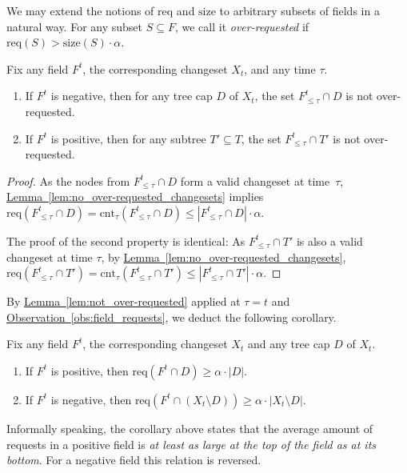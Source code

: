 \documentclass[sigconf,screen=true]{acmart}
\newcommand{\lref}[2][]{\hyperref[#2]{#1~\ref*{#2}}}
\newcommand{\size}{\textrm{size}}
\newcommand{\req}{\textrm{req}}
\newcommand{\cnt}{\textrm{cnt}}
\begin{document}
We may extend the notions of $\req$ and $\size$ to arbitrary subsets of fields
in a natural way.
For any subset $S \subseteq F$, we call it \emph{over-requested} if
$\req(S) > \size(S) \cdot \alpha$. 

\begin{lemma}
\label{lem:not_over-requested}
Fix any field $F^t$, the corresponding changeset $X_t$, and any time $\tau$.
\begin{enumerate}
\item If $F^t$ is negative, then for any tree cap $D$ of $X_t$, the set
    $F^t_{\leq \tau} \cap D$ is not over-requested.
\item If $F^t$ is positive, then for any subtree $T' \subseteq T$, the set
    $F^t_{\leq \tau} \cap T'$ is not over-requested.
\end{enumerate}
\end{lemma}

\begin{proof} 
As the nodes from $F^t_{\leq \tau} \cap D$ form a valid changeset at time~$\tau$, 
\lref[Lemma]{lem:no_over-requested_changesets} implies $\req(F^t_{\leq
\tau} \cap D) = \cnt_\tau(F^t_{\leq \tau} \cap D) \leq |F^t_{\leq \tau} \cap
D| \cdot \alpha$.

The proof of the second property is identical: As $F^t_{\leq \tau} \cap T'$ is
also a valid changeset at time $\tau$, by
\lref[Lemma]{lem:no_over-requested_changesets}, $\req(F^t_{\leq \tau}
\cap T') = \cnt_\tau(F^t_{\leq \tau} \cap T')
\leq |F^t_{\leq \tau} \cap T'| \cdot \alpha$. 
\end{proof}

By \lref[Lemma]{lem:not_over-requested} applied at $\tau = t$ and
\lref[Observation]{obs:field_requests}, we deduct the following corollary.

\begin{corollary}
\label{cor:density}
Fix any field $F^t$, the corresponding changeset $X_t$ and any tree
cap $D$ of $X_t$. 
\begin{enumerate}
\item If $F^t$ is positive, then $\req(F^t \cap D) \geq \alpha \cdot |D|$.
\item If $F^t$ is negative, then $\req(F^t \cap (X_t \setminus D)) \geq 
  \alpha \cdot \text{$|X_t \setminus D|$}$.
\end{enumerate}
\end{corollary} 

Informally speaking, the corollary above states that the average amount of
requests in a positive field is \emph{at least as large at the top of the
field as at its bottom}. For a negative field this relation is reversed.
\end{document}

